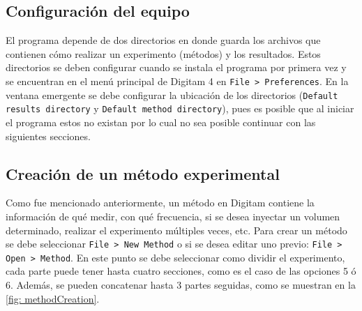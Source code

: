 	\subsection{Configuración del equipo}
	El programa depende de dos directorios en donde guarda los archivos que contienen c\'omo realizar un experimento (m\'etodos) y los resultados. Estos directorios se deben configurar cuando se instala el programa por primera vez y se encuentran en el men\'u principal de Digitam 4 en \texttt{File > Preferences}. En la ventana emergente se debe configurar la ubicaci\'on de los directorios (\texttt{Default results directory} y \texttt{Default method directory}), pues es posible que al iniciar el programa estos no existan por lo cual no sea posible continuar con las siguientes secciones.
	
	\subsection{Creación de un método experimental}
	Como fue mencionado anteriormente, un m\'etodo en Digitam contiene la informaci\'on de qu\'e medir, con qu\'e frecuencia, si se desea inyectar un volumen determinado, realizar el experimento m\'ultiples veces, etc. Para crear un m\'etodo se debe seleccionar \texttt{File > New Method} o si se desea editar uno previo: \texttt{File > Open > Method}. En este punto se debe seleccionar como dividir el experimento, cada parte puede tener hasta cuatro secciones, como es el caso de las opciones 5 \'o 6. Adem\'as, se pueden concatenar hasta 3 partes seguidas, como se muestran en la \autoref{fig: methodCreation}.
	

